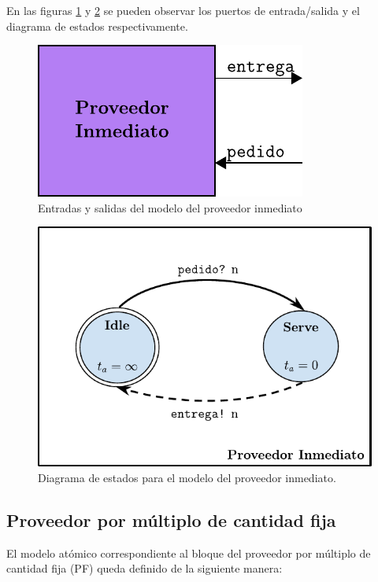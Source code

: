 \documentclass[10pt]{article}
\begin{document}
En las figuras \ref{fig:PI-esquematico} y \ref{fig:PI-estados} se pueden observar los puertos de entrada/salida y el diagrama de estados respectivamente.

\begin{figure}[htbp]
	\centering
	\includegraphics{img/PI-esquematico}
	\caption{Entradas y salidas del modelo del proveedor inmediato}
	\label{fig:PI-esquematico}
\end{figure}

\begin{figure}[htbp]
	\centering
	\includegraphics{img/proveedorInmediatodevsgraph}
	\caption{Diagrama de estados para el modelo del proveedor inmediato.}
	\label{fig:PI-estados}
\end{figure}
\FloatBarrier

\subsection{Proveedor por múltiplo de cantidad fija\label{sec:PF}}
El modelo atómico correspondiente al bloque del proveedor por múltiplo de cantidad fija (PF) queda definido de la siguiente manera:
\end{document}

